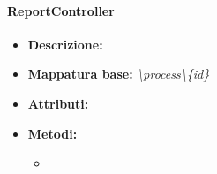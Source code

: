 \paragraph{ReportController}%
\begin{itemize}
	\item \textbf{Descrizione: } 
	\item \textbf{Mappatura base: } \textit{\textbackslash process\textbackslash \{id\}}
	\item \textbf{Attributi: }
	\item \textbf{Metodi: }\begin{itemize}
					\item 
				\end{itemize}
\end{itemize}